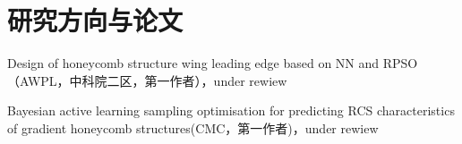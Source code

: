 \documentclass[]{deedy-resume-openfont}
\begin{document}
\begin{minipage}[t]{0.73\textwidth}
\section{研究方向与论文}
\sectionsep
{}
\begin{tightemize}
    \item Design of honeycomb structure wing leading edge based on NN and RPSO（AWPL，中科院二区，第一作者），under rewiew
    \item Bayesian active learning sampling optimisation for predicting RCS characteristics of gradient honeycomb structures(CMC，第一作者)，under rewiew
    \end{tightemize}
\sectionsep



\end{minipage}
\end{document}
